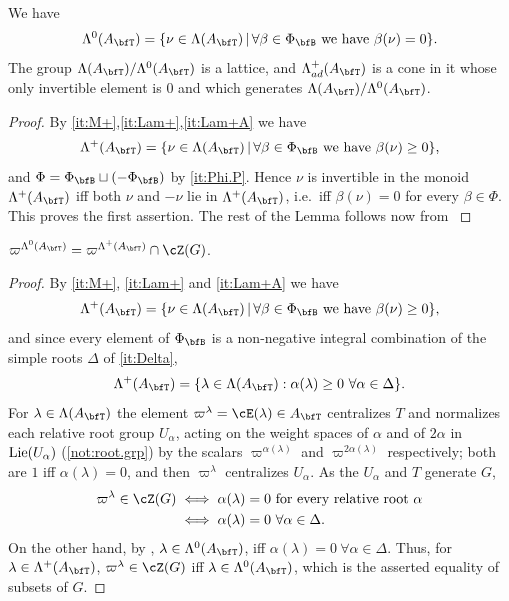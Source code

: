 \documentclass[12pt,a4paper]{amsart}%
\newcommand{\Rami}[1]{{{#1}}}
\newcommand{\claude}[1]{{{#1}}}
\begin{document}
\begin{lemma}\label{lem:Lam.ad.cone}
    We have
    $$\Lambda^0(A_{\bfT})=\{\nu\in \Lambda(A_{\bfT})\,|\,\forall \beta\in \Phi_{\Rami{\bfB}} \text{ we have } \beta(\nu)=0\}.$$
    The group $\Lambda(A_{\bfT})/\Lambda^0(A_{\bfT})$ is a lattice, and $\Lambda^+_{ad}(A_{\bfT})$ is a cone in it whose only invertible element is $0$ \claude{and which generates $\Lambda(A_{\bfT})/\Lambda^0(A_{\bfT})$}.
\end{lemma}
\begin{proof}
    By \eqref{it:M+},\eqref{it:Lam+},\eqref{it:Lam+A} we have
        \Rami{$$\Lambda^+(A_{\bfT})=\{\nu\in \Lambda(A_{\bfT})\,|\,\forall \beta\in \Phi_{{\bfB}} \text{ we have } \beta(\nu)\geq 0\},$$}
    and $\Phi=\Phi_\bfB\sqcup(-\Phi_\bfB)$ by \eqref{it:Phi.P}. Hence $\nu$ is invertible in the monoid $\Lambda^+(A_{\bfT})$ iff both $\nu$ and $-\nu$ lie in $\Lambda^+(A_{\bfT})$, i.e.\ iff $\beta(\nu)=0$ for every $\beta\in\Phi$. This proves the first assertion. 
    \Rami{The rest of the Lemma follows now from \Cref{lem:gen.cone.fac}}    
\end{proof}

\begin{lemma}\label{lem:Lam0.center}$\varpi^{\Lambda^0(A_{\bfT})}=\varpi^{\Lambda^+(A_{\bfT})}\cap \cZ(G)$.
\end{lemma}
\begin{proof}
    By \eqref{it:M+}, \eqref{it:Lam+} and \eqref{it:Lam+A} we have         \Rami{$$\Lambda^+(A_{\bfT})=\{\nu\in \Lambda(A_{\bfT})\,|\,\forall \beta\in \Phi_{{\bfB}} \text{ we have } \beta(\nu)\geq 0\},$$}
    and since every element of $\Phi_\bfB$ is a non-negative integral combination of the simple roots $\Delta$ of \eqref{it:Delta},
    $$\Lambda^+(A_{\bfT})=\{\lambda\in\Lambda(A_{\bfT}):\alpha(\lambda)\geq0\ \forall\alpha\in\Delta\}.$$
    For $\lambda\in\Lambda(A_{\bfT})$ the element $\varpi^\lambda=\cE(\lambda)\in A_\bfT$ centralizes $T$ and normalizes each relative root group $U_\alpha$, acting on the weight spaces of $\alpha$ and of $2\alpha$ in $\operatorname{Lie}(U_\alpha)$ (\eqref{not:root.grp}) by the scalars $\varpi^{\alpha(\lambda)}$ and $\varpi^{2\alpha(\lambda)}$ respectively; both are $1$ iff $\alpha(\lambda)=0$, and then $\varpi^\lambda$ centralizes $U_\alpha$. As the $U_\alpha$ and $T$ generate $G$,
    \begin{align*}
    \varpi^\lambda\in \cZ(G)&\iff \alpha(\lambda)=0\ \text{for every relative root }\alpha\\
    &\iff \alpha(\lambda)=0\ \forall\alpha\in\Delta.
    \end{align*}
    On the other hand, \Rami{by ,} $\lambda\in\Lambda^0(A_{\bfT})$, iff $\alpha(\lambda)=0\ \forall\alpha\in\Delta$. Thus, for $\lambda\in\Lambda^+(A_{\bfT})$, $\varpi^\lambda\in \cZ(G)$ iff $\lambda\in\Lambda^0(A_{\bfT})$, which is the asserted equality of subsets of $G$.
\end{proof}
\end{document}
